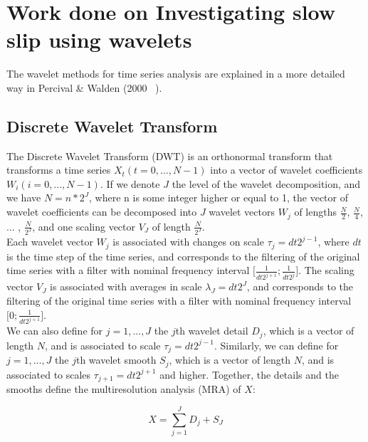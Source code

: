 \documentclass[workdone.tex]{subfiles}
\begin{document}
\chapter{Work done on Investigating slow slip using wavelets}

The wavelet methods for time series analysis are explained in a more detailed way in Percival \& Walden (2000 ~\cite{PER_2000}). \\

\section{Discrete Wavelet Transform}

The Discrete Wavelet Transform (DWT) is an orthonormal transform that transforms a time series $X_t \left( t = 0, ... , N - 1 \right)$ into a vector of wavelet coefficients $W_i \left( i = 0 , ... , N - 1 \right)$. If we denote $J$ the level of the wavelet decomposition, and we have $N = n* 2^J$, where n is some integer higher or equal to 1, the vector of wavelet coefficients can be decomposed into $J$ wavelet vectors $W_j$ of lengths $\frac{N}{2}$, $\frac{N}{4}$, ... , $\frac{N}{2^J}$, and one scaling vector $V_J$ of length $\frac{N}{2^J}$. \\

Each wavelet vector $W_j$ is associated with changes on scale $\tau_j = dt 2^{j - 1}$, where $dt$ is the time step of the time series, and corresponds to the filtering of the original time series with a filter with nominal frequency interval $\lbrack \frac{1}{dt 2^{j + 1}} ; \frac{1}{dt 2^j} \rbrack$. The scaling vector $V_J$ is associated with averages in scale $\lambda_J = dt 2^J$, and corresponds to the filtering of the original time series with a filter with nominal frequency interval $\lbrack 0 ; \frac{1}{dt 2^{j + 1}} \rbrack$. \\

We can also define for $j = 1 , ... , J$ the $j$th wavelet detail $D_j$, which is a vector of length $N$, and is associated to scale $\tau_j = dt 2^{j - 1}$. Similarly, we can define for $j = 1 , ... , J$ the $j$th wavelet smooth $S_j$, which is a vector of length $N$, and is associated to scales $\tau_{j + 1} = dt 2^{j + 1}$ and higher. Together, the details and the smooths define the multiresolution analysis (MRA) of $X$:

\begin{equation}
X = \sum_{j = 1}^{J} D_j + S_J
\end{equation}
\end{document}
